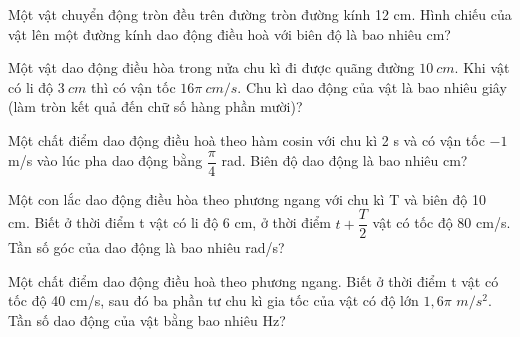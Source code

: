 \setcounter{ex}{0}
\PhanIII
\begin{ex}
Một vật chuyển động tròn đều trên đường tròn đường kính 12 cm. Hình chiếu của vật lên một đường kính dao động điều hoà với biên độ là bao nhiêu cm?
\loigiai{}
\end{ex}
\begin{ex}
Một vật dao động điều hòa trong nửa chu kì đi được quãng đường $10\ cm$. Khi vật có li độ $3\ cm$ thì có vận tốc $16\pi\ cm/s$. Chu kì dao động của vật là bao nhiêu giây (làm tròn kết quả đến chữ số hàng phần mười)?
\end{ex}
\begin{ex}%
Một chất điểm dao động điều hoà theo hàm cosin với chu kì 2 s và có vận tốc $- 1$ m/s vào lúc pha dao động bằng $\dfrac{\pi}{4}$ rad. Biên độ dao động là bao nhiêu cm?
\end{ex} 
\begin{ex}%
Một con lắc dao động điều hòa theo phương ngang với chu kì T và biên độ 10 cm. Biết ở thời điểm t vật có li độ 6 cm, ở thời điểm $t + \dfrac{T}{2}$ vật có tốc độ 80 cm/s. Tần số góc của dao động là bao nhiêu rad/s?
\end{ex} 
\begin{ex}%
Một chất điểm dao động điều hoà theo phương ngang. Biết ở thời điểm t vật có tốc độ 40 cm/s, sau đó ba phần tư chu kì gia tốc của vật có độ lớn $1,6\pi$ $m/s^2$. Tần số dao động của vật bằng bao nhiêu Hz?
\end{ex} 
